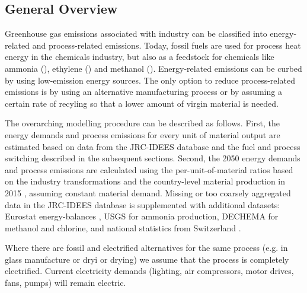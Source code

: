 \subsection{General Overview}
\label{sec:si:industry:overview}

Greenhouse gas emissions associated with industry can be classified into
energy-related and process-related emissions. Today, fossil fuels are used for
process heat energy in the chemicals industry, but also as a feedstock for
chemicals like ammonia (), ethylene () and methanol
(). Energy-related emissions can be curbed by using low-emission
energy sources. The only option to reduce process-related emissions is by using
an alternative manufacturing process or by assuming a certain rate of recyling
so that a lower amount of virgin material is needed.

The overarching modelling procedure can be described as follows. First, the
energy demands and process emissions for every unit of material output are
estimated based on data from the JRC-IDEES database  and the fuel
and process switching described in the subsequent sections. Second, the 2050
energy demands and process emissions are calculated using the
per-unit-of-material ratios based on the industry transformations and the
country-level material production in 2015 , assuming constant
material demand. Missing or too coarsely aggregated data in the JRC-IDEES
database  is supplemented with additional datasets: Eurostat
energy-balances \citeS{}, USGS  for ammonia production, DECHEMA
 for methanol and chlorine, and national
statistics from Switzerland \citeS{}.

Where there are fossil and electrified alternatives for the same process (e.g.
in glass manufacture or dryi or drying) we assume that the process is completely
electrified. Current electricity demands (lighting, air compressors, motor
drives, fans, pumps) will remain electric.

